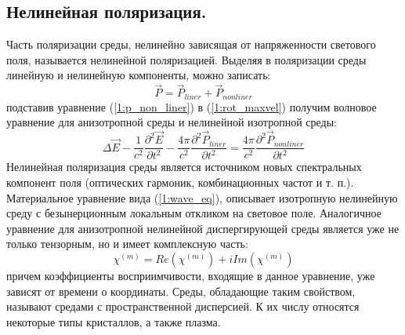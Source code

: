 \subsection{Нелинейная поляризация.} 
\hspace*{2mm}
Часть поляризации среды, нелинейно зависящая от напряженности светового поля, называется нелинейной поляризацией. Выделяя в поляризации среды линейную и нелинейную компоненты, можно записать:
\begin{equation}\label{1:p_non_liner}
\vec{P} = \vec{P}_{liner} + \vec{P}_{nonliner}
\end{equation}подставив уравнение  (\ref{1:p_non_liner}) в  (\ref{1:rot_maxvel}) получим волновое уравнение для анизотропной среды и нелинейной изотропной среды:
\begin{equation}\label{1:wave_eq2}
\Delta\vec{E} - \frac{ 1 }{ c^2 }\frac{\partial^2 \vec{E} }{\partial t^2} - \frac{ 4\pi }{ c^2 }\frac{\partial^2 \vec{P}_{liner}}{\partial t^2} =  \frac{ 4\pi }{ c^2 }\frac{\partial^2 \vec{P} _{nonliner}}{\partial t^2}
\end{equation}Нелинейная поляризация среды является источником новых спектральных компонент поля (оптических гармоник, комбинационных частот и т. п.). Материальное уравнение вида  (\ref{1:wave_eq}), описывает изотропную нелинейную среду с безынерционным локальным откликом на световое поле. Аналогичное уравнение для анизотропной нелинейной диспергирующей среды является уже не только тензорным, но и имеет комплексную часть: 
\begin{equation}
\chi^{(m)} = Re(\chi^{(m)}) + iIm(\chi^{(m)})
\end{equation}причем коэффициенты восприимчивости, входящие в данное уравнение, уже зависят от времени о координаты. Среды, обладающие таким свойством, называют средами с пространственной дисперсией. К их числу относятся некоторые типы кристаллов, а также плазма.

